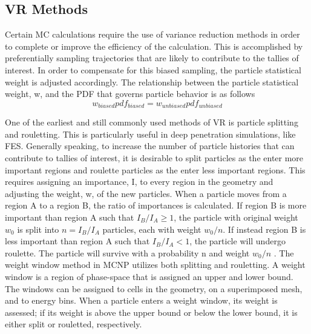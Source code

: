 \subsection{VR Methods}

Certain MC calculations require the use of variance reduction methods in order
to complete or improve the efficiency of the calculation. 
This is accomplished
by preferentially sampling trajectories that are likely to contribute to the tallies of
interest.
In order to compensate for this biased sampling, the particle statistical weight
is adjusted accordingly.
The relationship between the particle statistical weight, w, and the PDF that
governs particle behavior is as follows
\begin{equation} \label{eq:2.1}
		w_{biased} pdf_{biased} = w_{unbiased} pdf_{unbiased}
\end{equation}

One of the earliest and still commonly used methods of VR is particle splitting
and rouletting.  This is particularly useful in deep penetration simulations,
like FES.  Generally speaking, to increase the number of particle
histories that can contribute to tallies of interest, it is desirable to split
particles as the enter more important regions and roulette particles as the
enter less important regions. 
This requires assigning an importance, I, to every
region in the geometry and adjusting the weight, w, of the new particles. 
When a particle moves from a region A to a region B,
the ratio of importances is calculated.  If region B is more important than
region A such that 
$I_{B}/I_{A} \geqslant 1$, 
the particle with original weight $w_{0}$ is split into 
$n = I_{B}/I_{A}$
particles, each with weight $w_{0}/n$.  If instead region B is less important
than
region A such that
$I_{B}/I_{A} < 1$, 
the particle will undergo roulette. 
The particle will survive with a probability n and weight $w_{0}/n$
\cite{Carter_Cashwell_1975}.
The weight window method in MCNP utilizes both splitting and
rouletting.  A weight window is a region of phase-space that is assigned an upper and
lower bound.  The windows can be assigned to cells in the geometry, on a
superimposed mesh, and to energy bins.  When a particle enters a weight window, its weight is assessed; if
its weight is above the upper bound or below the lower bound, it is either split
or rouletted, respectively.
